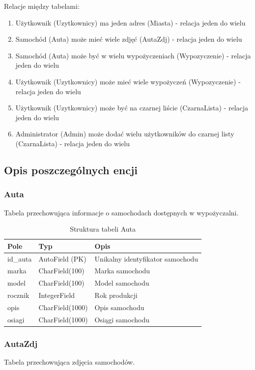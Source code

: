 \documentclass[12pt,a4paper]{article}
\begin{document}
Relacje między tabelami:
\begin{enumerate}
    \item Użytkownik (Uzytkownicy) ma jeden adres (Miasta) - relacja jeden do wielu
    \item Samochód (Auta) może mieć wiele zdjęć (AutaZdj) - relacja jeden do wielu
    \item Samochód (Auta) może być w wielu wypożyczeniach (Wypozyczenie) - relacja jeden do wielu
    \item Użytkownik (Uzytkownicy) może mieć wiele wypożyczeń (Wypozyczenie) - relacja jeden do wielu
    \item Użytkownik (Uzytkownicy) może być na czarnej liście (CzarnaLista) - relacja jeden do wielu
    \item Administrator (Admin) może dodać wielu użytkowników do czarnej listy (CzarnaLista) - relacja jeden do wielu
\end{enumerate}

\newpage

\subsection{Opis poszczególnych encji}

\subsubsection{Auta}
Tabela przechowująca informacje o samochodach dostępnych w wypożyczalni.

\begin{table}[H]
\centering
\begin{tabular}{|l|l|p{7cm}|}
\hline
\textbf{Pole} & \textbf{Typ} & \textbf{Opis} \\
\hline
id\_auta & AutoField (PK) & Unikalny identyfikator samochodu \\
\hline
marka & CharField(100) & Marka samochodu \\
\hline
model & CharField(100) & Model samochodu \\
\hline
rocznik & IntegerField & Rok produkcji \\
\hline
opis & CharField(1000) & Opis samochodu \\
\hline
osiagi & CharField(1000) & Osiągi samochodu \\
\hline
\end{tabular}
\caption{Struktura tabeli Auta}
\end{table}

\subsubsection{AutaZdj}
Tabela przechowująca zdjęcia samochodów.
\end{document}
